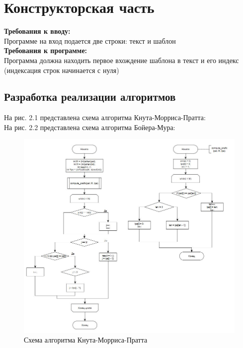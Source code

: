\documentclass[12pt]{report}
\begin{document}
\chapter{Конструкторская часть}
\textbf{Требования к вводу:}\\
Программе на вход подается две строки: текст и шаблон\\
\textbf{Требования к программе:}\\
Программа должна находить первое вхождение шаблона в текст и его индекс (индексация строк начинается с нуля) \\


\section{Разработка реализации алгоритмов}


На рис. 2.1 представлена схема алгоритма Кнута-Морриса-Пратта:\\
На рис. 2.2 представлена схема алгоритма Бойера-Мура:\\

	\begin{figure}[h]
        	\begin{center}
        		\includegraphics[scale=0.8]{1}
        		\caption{Схема алгоритма Кнута-Морриса-Пратта}
        		\label{fig:def}
        	\end{center}
        \end{figure}
\end{document}
